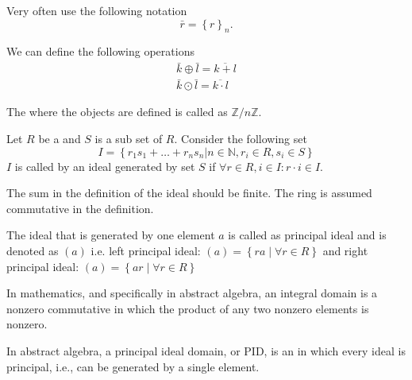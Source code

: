 \begin{appendices}
\begin{example}
  Very often use the following notation
  \[
  \bar{r} = \left\{r\right\}_n.
  \]

  We can define the following operations
  \begin{eqnarray}
    \bar{k} \oplus \bar{l} = \overline{k + l}
    \nonumber \\
    \bar{k} \odot \bar{l} = \overline{k \cdot l}
    \nonumber
  \end{eqnarray}
  
  The  where the objects are defined is called as
  $\mathbb{Z}/n\mathbb{Z}$.
  \label{ex:intmodulo}
\end{example}

\begin{definition}
  Let $R$ be a  and $S$ is a sub set of $R$.
  Consider the following set
  \[
  I = \left\{
  r_1 s_1 + \dots + r_n s_n \vert n \in \mathbb{N}, r_i \in R, s_i \in S
  \right\}
  \]
  $I$ is called by an ideal generated by set $S$ if
  $\forall r \in R, i \in I: r \cdot i \in I$.

  The sum in the definition of the ideal should be finite. The ring is
  assumed commutative in the definition.
  \label{def:idealset}
\end{definition}

\begin{definition}
  The ideal that is generated by one element $a$ is called as
  principal ideal and is denoted as $\left(a\right)$ i.e.
  left principal ideal:
  $\left(a\right) = \left\{r a \mid \forall r \in R\right\}$ and
  right principal ideal:
  $\left(a\right) = \left\{a r \mid \forall r \in R\right\}$
  \label{def:prinicipalideal}
\end{definition}

\begin{definition}
In mathematics, and specifically in abstract algebra, an integral
domain is a nonzero commutative  in which the
product of any two nonzero elements is nonzero.
\label{def:integraldomain}
\end{definition}

\begin{definition}
  In abstract algebra, a principal ideal domain, or PID, is an
   in which every ideal is principal, i.e., can be
  generated by a single element.
  \label{def:pid}
\end{definition}


\end{appendices}
